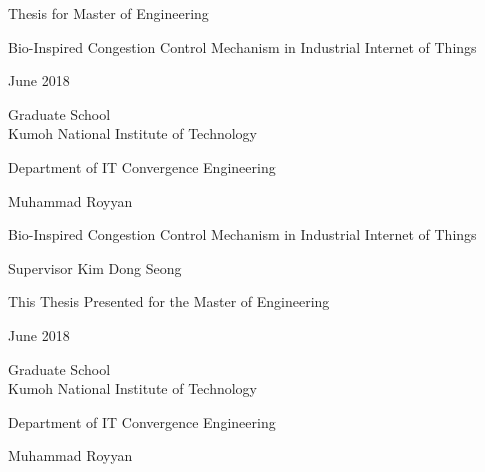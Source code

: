 \begin{titlepage}
	\begin{center}      
		\vspace*{1.5 cm}
		
		
		{\fontsize{14}{20}\selectfont Thesis for Master of Engineering}
		
		\vspace{1.5 cm}
		\begin{spacing}{2.0}
			{\fontsize{22}{30}\selectfont Bio-Inspired Congestion Control Mechanism in Industrial Internet of Things}	
		\end{spacing}
		\vfill
		{\fontsize{14}{20}\selectfont June 2018}
		
		\vspace{1 cm}
		\begin{spacing}{1.5}
			{\fontsize{16}{25}\selectfont Graduate School \\ Kumoh National Institute of Technology}	
		\end{spacing}
		\vspace{1 cm}
		{\fontsize{14}{20}\selectfont Department of IT Convergence Engineering}
		
		\vspace{1 cm}
		{\fontsize{16}{25}\selectfont Muhammad Royyan}
		
		\vspace*{1.5 cm}
	\end{center}
\end{titlepage}

\begin{titlepage}
	\begin{center}      
		\vspace*{4.5 cm}
		\begin{spacing}{2.0}
			{\fontsize{22}{30}\selectfont Bio-Inspired Congestion Control Mechanism in Industrial Internet of Things}
		\end{spacing}
		
		\vspace{1 cm}
		{\fontsize{14}{20}\selectfont Supervisor  Kim Dong Seong}
		
		\vspace{1 cm}
		{\fontsize{16}{25}\selectfont This Thesis Presented for the Master of Engineering} 
		
		\vfill
		{\fontsize{14}{20}\selectfont June 2018}
		
		\vspace{1 cm}
		\begin{spacing}{1.5}
			{\fontsize{16}{25}\selectfont Graduate School\\ Kumoh National Institute of Technology}
		\end{spacing}
		\vspace{1 cm}
		{\fontsize{14}{20}\selectfont Department of IT Convergence Engineering}
		
		\vspace{1 cm}
		{\fontsize{16}{25}\selectfont Muhammad Royyan}
		
		\vspace{1.5 cm}
		
	\end{center}
\end{titlepage}

